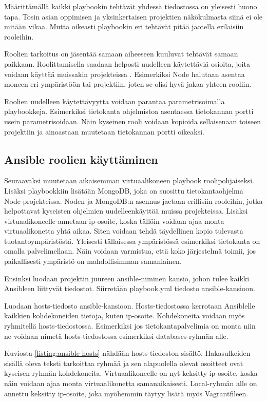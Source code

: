 Määrittämällä kaikki playbookin tehtävät yhdessä tiedostossa on yleisesti huono tapa. Tosin asian oppimisen ja yksinkertaisen projektien näkökulmasta siinä ei ole mitään vikaa. Mutta oikeasti playbookin eri tehtävät pitää jaotella erilaisiin rooleihin.

Roolien tarkoitus on jäsentää samaan aiheeseen kuuluvat tehtävät samaan paikkaan. Roolittamisella saadaan helposti uudelleen käytettäviä osioita, joita voidaan käyttää muissakin projekteissa \cite{link:ansible-roles-and-includes}. Esimerkiksi Node halutaan asentaa moneen eri ympäristöön tai projektiin, joten se olisi hyvä jakaa yhteen rooliin.

Roolien uudelleen käytettävyytta voidaan parantaa parametrisoimalla playbookkeja. Esimerkiksi tietokanta ohjelmistoa asentaessa tietokannan portti usein parametrisoidaan. Näin kyseinen rooli voidaan kopioida sellaisenaan toiseen projektiin ja ainoastaan muutetaan tietokannan portti oikeaksi.

\subsection{Ansible roolien käyttäminen}

Seuraavaksi muutetaan aikaisemman virtuaalikoneen playbook roolipohjaiseksi. Lisäksi playbookkiin lisätään MongoDB, joka on suosittu tietokantaohjelma Node-projekteissa. Noden ja MongoDB:n asennus jaetaan erillisiin rooleihin, jotka helpottavat kyseisten ohjelmien uudelleenkäyttöä muissa projekteissa. Lisäksi virtuaalikoneelle annetaan ip-osoite, koska tällöin voidaan ajaa monta virtuaalikonetta yhtä aikaa. Siten voidaan tehdä täydellinen kopio tulevasta tuotantoympäristöstä. Yleisesti tällaisessa ympäristössä esimerkiksi tietokanta on omalla palvelimellaan. Näin voidaan varmistua, että koko järjestelmä toimii, jos paikallisesti ympäristö on mahdollisimman samanlainen.

Ensinksi luodaan projektin juureen ansible-niminen kansio, johon tulee kaikki Ansibleen liittyvät tiedostot. Siirretään playbook.yml tiedosto ansible-kansioon.

Luodaan hosts-tiedosto ansible-kansioon. Hosts-tiedostossa kerrotaan Ansiblelle kaikkien kohdekoneiden tietoja, kuten ip-osoite. Kohdekoneita voidaan myös ryhmitellä hosts-tiedostossa. Esimerkiksi jos tietokantapalvelimia on monta niin ne voidaan nimetä hosts-tiedostossa esimerkiksi databases-ryhmän alle.

Kuviosta \ref{listing:ansible-hosts} nähdään hosts-tiedoston sisältö. Hakasulkeiden sisällä oleva teksti tarkoittaa ryhmää ja sen alapuolella olevat osoitteet ovat kyseisen ryhmän kohdekoneita. Virtuaalikoneelle on nyt keksitty ip-osoite, koska näin voidaan ajaa monta virtuaalikonetta samanaikaisesti. Local-ryhmän alle on annettu keksitty ip-osoite, joka myöhemmin täytyy lisätä myös Vagrantfileen.

